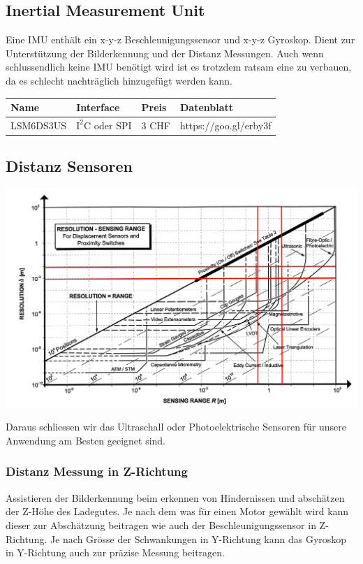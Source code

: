 \documentclass[a4paper]{report}
\begin{document}
\vspace{1em}
\noindent

\subsection{Inertial Measurement Unit}
\label{app:ssec:IMU}
Eine IMU enthält ein x-y-z Beschleunigungssensor und x-y-z
Gyroskop. Dient zur Unterstützung der Bilderkennung und der Distanz
Messungen. Auch wenn schlussendlich keine IMU benötigt wird ist es trotzdem
ratsam eine zu verbauen, da es schlecht nachträglich hinzugefügt werden kann.

\vspace{1em}
\noindent
\begin{tabular}{|p{}|p{}|p{}|p{}|}
  \hline
  \textbf{Name} & \textbf{Interface} & \textbf{Preis} & \textbf{Datenblatt} \\
  \hline
  LSM6DS3US & $\text{I}^2\text{C}$ oder SPI & 3 CHF & https://goo.gl/erby3f \\
  \hline
\end{tabular}

\subsection{Distanz Sensoren}
\label{app:ssec:DistSens}
\includegraphics[width=\textwidth]{DistanzSensor}

Daraus schliessen wir das Ultraschall oder Photoelektrische
Sensoren für unsere Anwendung am Besten geeignet sind.

\subsubsection{Distanz Messung in Z-Richtung}
\label{app:ssec:DistMessZ}
Assistieren der Bilderkennung beim erkennen von Hindernissen und
abschätzen der Z-Höhe des Ladegutes. Je nach dem was für einen Motor gewählt
wird kann dieser zur Abschätzung beitragen wie auch der Beschleunigungssensor
in Z-Richtung. Je nach Grösse der Schwankungen in Y-Richtung kann das Gyroskop
in Y-Richtung auch zur präzise Messung beitragen.
\end{document}
